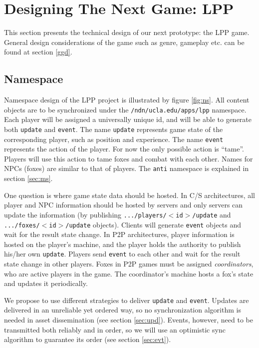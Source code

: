 \documentclass{article}
\begin{document}
\section{Designing The Next Game: LPP}
\label{sec:dslpp}
This section presents the technical design of our next prototype: the LPP game. General design considerations of the game such as genre, gameplay etc. can be found at section \ref{ggd}. 

\subsection{Namespace}
Namespace design of the LPP project is illustrated by figure \ref{fig:ns}. All content objects are to be synchronized under the \texttt{/ndn/ucla.edu/apps/lpp} namespace. Each player will be assigned a universally unique id, and will be able to generate both \texttt{update} and \texttt{event}. The name \texttt{update} represents game state of the corresponding player, such as position and experience.  The name \texttt{event} represents the action of the player. For now the only possible action is ``tame''. Players will use this action to tame foxes and combat with each other. Names for NPCs (foxes) are similar to that of players. The \texttt{anti} namespace is explained in section \ref{sec:ms}.

One question is where game state data should be hosted. In C/S architectures, all player and NPC information should be hosted by servers and only servers can update the information (by publishing \texttt{.../players/$<$id$>$/update} and \texttt{.../foxes/$<$id$>$/update} objects). Clients will generate \texttt{event} objects and wait for the result state change. In P2P architectures, player information is hosted on the player's machine, and the player holds the authority to publish his/her own \texttt{update}. Players send \texttt{event} to each other and wait for the result state change in other players. Foxes in P2P games must be assigned \emph{coordinators}, who are active players in the game. The coordinator's machine hosts a fox's state and updates it periodically.

We propose to use different strategies to deliver \texttt{update} and \texttt{event}. Updates are delivered in an unreliable yet ordered way, so no synchronization algorithm is needed in asset dissemination (see section \ref{sec:upd}). Events, however, need to be transmitted both reliably and in order, so we will use an optimistic sync algorithm to guarantee its order (see section \ref{sec:evt}).
\end{document}
